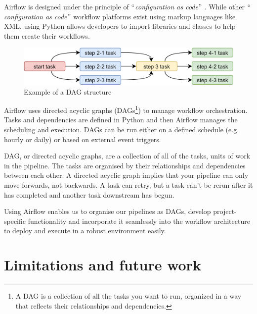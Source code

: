 Airflow is designed under the principle of $``$\textit{configuration as code}$"$ . While other $``$\textit{configuration as code}$"$  workflow platforms exist using markup languages like XML, using Python allows developers to import libraries and classes to help them create their workflows.

\begin{Center}
\begin{figure}[H]
	\begin{Center}
		\includegraphics[width=\textwidth]{images/image2.png}
		\caption{Example of a DAG structure}
		\label{fig:Example_of_a_DAG_structure}
	\end{Center}
\end{figure}
\end{Center}

Airflow uses directed acyclic graphs (DAGs\footnote{ A DAG is a collection of all the tasks you want to run, organized in a way that reflects their relationships and dependencies. }) to manage workflow orchestration. Tasks and dependencies are defined in Python and then Airflow manages the scheduling and execution. DAGs can be run either on a defined schedule (e.g. hourly or daily) or based on external event triggers.

DAG, or directed acyclic graphs, are a collection of all of the tasks, units of work in the pipeline. The tasks are organised by their relationships and dependencies between each other. A directed acyclic graph implies that your pipeline can only move forwards, not backwards. A task can retry, but a task can't be rerun after it has completed and another task downstream has begun.

Using Airflow enables us to organise our pipelines as DAGs, develop project-specific functionality and incorporate it seamlessly into the workflow architecture to deploy and execute in a robust environment easily.

\section{Limitations and future work}

